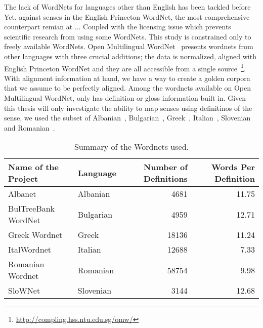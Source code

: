 The lack of WordNets for languages other than English has been tackled before %
Yet, against %
senses in the English Princeton WordNet, the most comprehensive counterpart remian at ... %
Coupled with the licensing issue which prevents scientific research from using some WordNets.
This study is constrained only to freely available WordNets.
Open Multilingual WordNet~\cite{bond_survey_2012} presents wordnets from other languages with three crucial additions; %
the data is normalized, aligned with English Princeton WordNet and they are all accessible from a single source~\footnote{\url{http://compling.hss.ntu.edu.sg/omw/}}.
With alignment information at hand, we have a way to create a golden corpora that we assume to be perfectly aligned.
Among the %
wordnets available on Open Multilingual WordNet, only %
has definition or gloss information built in.
Given this thesis will only investigate the ability to map senses using definitinos of the sense, we used the subset of Albanian~\cite{ruci_current_2008}, Bulgarian~\cite{simov_constructing_2010}, Greek~\cite{stamou_exploring_2004}, Italian~\cite{pianta_multiwordnet_2002}, Slovenian~\cite{fiser_slownet_2012} and Romanian~\cite{tufis_romanian_2008}.
\begin{table*}[!hbp]
    \begin{center}
        \caption{Summary of the Wordnets used.}\label{tab:summary_table}
        \begin{tabular}{llrr}
            \toprule%
            \textbf{Name of the Project} & \textbf{Language} & \textbf{Number of Definitions} & \textbf{Words Per Definition} \\
            \midrule%
            Albanet & Albanian & 4681 & 11.75 \\
            BulTreeBank WordNet & Bulgarian & 4959 & 12.71 \\
            Greek Wordnet & Greek & 18136 & 11.24 \\
            ItalWordnet & Italian & 12688 & 7.33 \\
            Romanian Wordnet & Romanian & 58754 & 9.98 \\
            SloWNet & Slovenian & 3144 & 12.68 \\
            \bottomrule %
        \end{tabular}
    \end{center}
\end{table*}

